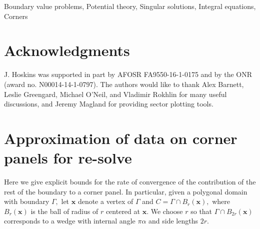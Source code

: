 \documentclass[12pt,times]{elsarticle}
\newcommand{\bx}{\boldsymbol{x}}
\begin{document}
\begin{frontmatter}
\begin{keyword}
Boundary value problems, Potential theory, Singular solutions, Integral equations, Corners
\end{keyword}

\end{frontmatter}









\section{Acknowledgments}
J. Hoskins was supported in part by AFOSR FA9550-16-1-0175 and by the ONR (award no. N00014-14-1-0797).
The authors would like to thank Alex Barnett, Leslie Greengard, Michael O'Neil, and Vladimir Rokhlin for many useful discussions, and Jeremy Magland for providing sector plotting tools.

\appendix
\section{Approximation of data on corner panels for re-solve}
Here we give explicit bounds for the rate of convergence of the contribution of the rest of the boundary to a corner panel.{\color{red} In particular, given a polygonal domain with boundary $\Gamma,$ let $\bx$ denote a vertex of $\Gamma$ and $C = \Gamma \cap B_r(\bx),$ where $B_r(\bx)$ is the ball of radius of $r$ centered at $\bx.$ We choose $r$ so that $\Gamma \cap B_{2r}(\bx)$ corresponds to a wedge with internal angle $\pi \alpha$ and side lengths $2r.$ }
\end{document}
